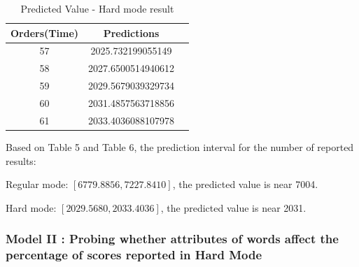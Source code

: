 \documentclass{mcmthesis}
\begin{document}
\begin{itemize}
\begin{table}[H]  %
    \centering        %
    \caption{Predicted Value - Hard mode result}  %
    \vspace{0.2cm}
    \label{tab7}                       %
    \renewcommand\arraystretch{1.2}
    \begin{tabular}{|c|c|c|}  %
    \hline                    %
    Orders(Time) & Predictions \\ \hline  %
    57 & 	2025.732199055149   \\ \hline
    58 &    2027.6500514940612   \\ \hline
    59 &	2029.5679039329734   \\ \hline
    60 &	2031.4857563718856   \\ \hline
    61 &	2033.4036088107978  \\ \hline
    \end{tabular}
\end{table}
        

   
    Based on Table 5 and Table 6, the prediction interval for the number of reported results:
        
    Regular mode: $[6779.8856,7227.8410]$, the predicted value is near 7004.
    
    Hard mode: $[2029.5680,2033.4036]$, the predicted value is near 2031.

\end{itemize}    


\subsubsection{Model II : Probing whether attributes of words affect the percentage of scores reported in Hard Mode}
\end{document}
